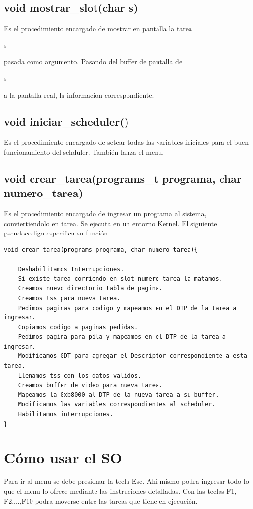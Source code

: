 \documentclass[a4paper,10pt]{article}
\begin{document}
\subsection*{void mostrar\_slot(char s)}
Es el procedimiento encargado de mostrar en pantalla la tarea \begin{it}s\end{it} pasada como argumento. Pasando del buffer de pantalla de \begin{it}s\end{it} a la pantalla real, la informacion correspondiente.

\subsection*{void iniciar\_scheduler()}
Es el procedimiento encargado de setear todas las variables iniciales para el buen funcionamiento del schduler. También lanza el menu.

\subsection*{void crear\_tarea(programs\_t programa, char numero\_tarea)}
Es el procedimiento encargado de ingresar un programa al sistema, conviertiendolo en tarea. Se ejecuta en un entorno Kernel.
El siguiente pseudocodigo especifica su función.
\begin{verbatim}
void crear_tarea(programs programa, char numero_tarea){
    
    Deshabilitamos Interrupciones.
    Si existe tarea corriendo en slot numero_tarea la matamos.
    Creamos nuevo directorio tabla de pagina.
    Creamos tss para nueva tarea.
    Pedimos paginas para codigo y mapeamos en el DTP de la tarea a ingresar.
    Copiamos codigo a paginas pedidas.
    Pedimos pagina para pila y mapeamos en el DTP de la tarea a ingresar.
    Modificamos GDT para agregar el Descriptor correspondiente a esta tarea.
    Llenamos tss con los datos validos.
    Creamos buffer de video para nueva tarea.
    Mapeamos la 0xb8000 al DTP de la nueva tarea a su buffer.
    Modificamos las variables correspondientes al scheduler.
    Habilitamos interrupciones.
}
\end{verbatim}


\section*{C\'omo usar el SO}
Para ir al menu se debe presionar la tecla Esc. Ahi mismo podra ingresar todo lo que el menu lo ofrece mediante las instruciones detalladas.
Con las teclas F1, F2,...,F10 podra moverse entre las tareas que tiene en ejecución.
\end{document}
